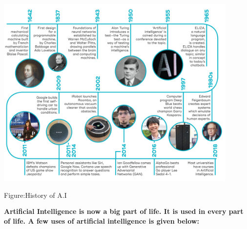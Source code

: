 \documentclass{article}
\begin{document}
{ %
 \includegraphics[width=12cm]{History Of AI 2.jpg}\par
 \centering
  \caption{Figure:History of A.I }\smallskip
\par\linebreak}


\linebreak 
\noindent

\noindent \textbf{}

\noindent \textbf{Artificial Intelligence is now a big part of life. It is used in every part of life. A few uses of artificial intelligence is given below:}
\end{document}
